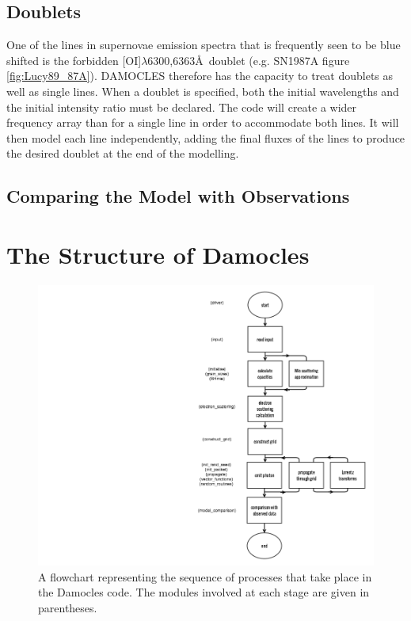 	\subsection{Doublets}

One of the lines in supernovae emission spectra that is frequently seen to be blue shifted is the forbidden [OI]$\lambda$6300,6363\AA\ doublet (e.g. SN1987A \citep{LucyEtAl89} figure \ref{fig:Lucy89_87A}).  DAMOCLES therefore has the capacity to treat doublets as well as single lines.  When a doublet is specified, both the initial wavelengths and the initial intensity ratio must be declared.  The code will create a wider frequency array than for a single line in order to accommodate both lines.  It will then model each line independently, adding the final fluxes of the lines to produce the desired doublet at the end of the modelling. 

\subsection{Comparing the Model with Observations}
	
\section{The Structure of Damocles}
\label{damocles_struct}
	
	\begin{centering}
	\begin{figure}
	\includegraphics[scale=0.8, trim=160mm 5mm 8mm 5mm]{chapters/chapter2/code_flow.png}
	\caption{A flowchart representing the sequence of processes that take place in the Damocles code.  The modules involved at each stage are given in parentheses.}
	\label{fig:flowchart}
	\end{figure}
	\end{centering}	
	
